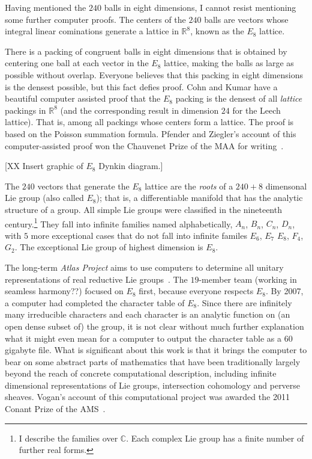 \documentclass{llncs}
\newcommand{\ring}[1]{\mathbb{#1}}
\begin{document}
Having mentioned the $240$ balls in eight dimensions, I cannot resist
mentioning some further computer proofs.  The centers of the $240$ balls
are vectors whose integral linear cominations generate 
a lattice in $\ring{R}^8$, known as the $E_8$ lattice.

There is a packing of congruent balls in eight dimensions that is
obtained by centering one ball at each vector in the $E_8$ lattice,
making the balls as large as possible without overlap.  Everyone
believes that this packing in eight dimensions is the densest
possible, but this fact defies proof.  Cohn and Kumar have a beautiful
computer assisted proof that the $E_8$ packing is the densest of all
{\it lattice} packings in $\ring{R}^8$ (and the corresponding result in
dimension $24$ for the Leech lattice).  That is, among all packings
whose centers form a lattice.  The proof is based on the Poisson
summation formula.  Pfender and Ziegler's account of this
computer-assisted proof won the Chauvenet Prize of the MAA for
writing~\cite{PZ}.


[XX Insert graphic of $E_8$ Dynkin diagram.]

The $240$ vectors that generate the $E_8$ lattice are the {\it roots}
of a $240+8$ dimensonal Lie group (also called $E_8$); that is, a
differentiable manifold that has the analytic structure of a group.  All simple
Lie groups were classified in the nineteenth century.\footnote{I
  describe the families over $\ring{C}$.  Each complex Lie group has a
  finite number of further real forms.}  They fall into infinite
families named alphabetically, $A_n$, $B_n$, $C_n$, $D_n$, with $5$
more exceptional cases that do not fall into infinite familes $E_6$,
$E_7$ $E_8$, $F_4$, $G_2$.  The exceptional Lie group of highest
dimension is $E_8$.

The long-term {\it Atlas Project} aims to use computers to determine
all unitary representations of real reductive Lie groups~\cite{Atlas}.  The $19$-member team
(working in seamless harmony??)  focused on $E_8$ first, because
everyone respects $E_8$.  By 2007, a
computer had completed the character table of $E_8$.  Since there are
infinitely many irreducible characters and each character is an
analytic function on (an open dense subset of) the group, it is not
clear without much further explanation what it might even mean for a 
computer to output the character table as a $60$ gigabyte file.  What is
significant about this work is that it brings the computer to bear on
some abstract parts of mathematics that have been traditionally
largely beyond the reach of concrete computational description,
including infinite dimensional representations of Lie groups,
intersection cohomology and perverse sheaves.  Vogan's account of this
computational project was awarded the 2011 Conant Prize of the AMS~\cite{VE8}.
\end{document}
